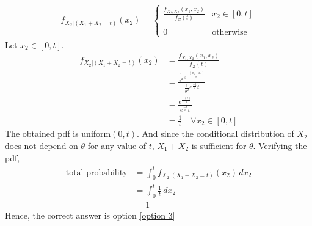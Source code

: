 \documentclass[journal,12pt,twocolumn]{IEEEtran}
\begin{document}
\begin{align}
    f_{X_2|(X_1+X_2=t)}(x_2) = 
    \begin{cases}
    \frac{f_{X_1,X_2}(x_1,x_2)}{f_Z(t)} &  x_2 \in [0, t]\\ ~\\[-1em]
    0 & \text{otherwise}
    \end{cases}
\end{align}
Let $ x_2 \in [0, t]$.
\begin{align}
    f_{X_2|(X_1+X_2=t)}(x_2) &= \frac{f_{X_1,X_2}(x_1,x_2)}{f_Z(t)}
    \\&= \frac{\frac{1}{\theta^2}e^{\frac{-(x_1+x_2)}{\theta}}}{\frac{1}{\theta^2}e^{\frac{-t}{\theta}}t}
    \\&= \frac{e^{\frac{-(t)}{\theta}}}{e^{\frac{-t}{\theta}}t}
    \\&= \frac{1}{t} \quad \forall x_2 \in [0, t]
\end{align}
The obtained pdf is uniform$(0,t)$. And since the conditional distribution of $X_2$ does not depend on $\theta$ for any value of $t$, $X_1+X_2$ is sufficient for $\theta$. Verifying the pdf,
\begin{align}
    \text{total probability} &= \int_{0}^{t} f_{X_2|(X_1+X_2=t)}(x_2) \,dx_2
    \\&= \int_{0}^{t} \frac{1}{t} \,dx_2
    \\&= 1
\end{align}
Hence, the correct answer is option \eqref{option 3}
\end{document}
